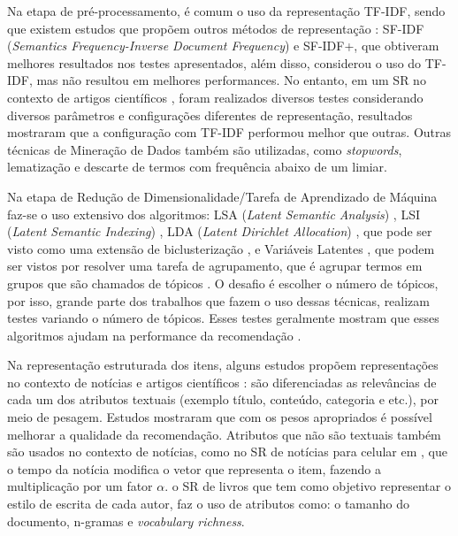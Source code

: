 \documentclass[normaltoc, espacoumemeio, pnumromarab,ruledheader]{abnt}
\begin{document}
Na etapa de pré-processamento, é comum o uso da representação TF-IDF, sendo que existem estudos que propõem outros métodos de representação \cite{Capelle2012, Moerland2013}: SF-IDF (\textit{Semantics Frequency-Inverse Document Frequency}) e SF-IDF+, que obtiveram melhores resultados nos testes apresentados, além disso,  considerou o uso do TF-IDF, mas não resultou em melhores performances.
No entanto, em um SR no contexto de artigos científicos \cite{Beel2013}, foram realizados diversos testes considerando diversos parâmetros e configurações diferentes de representação, resultados mostraram que a configuração com TF-IDF performou melhor que outras.
Outras técnicas de Mineração de Dados também são utilizadas, como \textit{stopwords}, lematização e descarte de termos com frequência abaixo de um limiar.

Na etapa de Redução de Dimensionalidade/Tarefa de Aprendizado de Máquina faz-se o uso extensivo dos algoritmos: LSA (\textit{Latent Semantic Analysis}) \cite{Taraghi2013, Domingues2012, Spaeth2013}, LSI (\textit{Latent Semantic Indexing}) \cite{Saaya2013}, LDA (\textit{Latent Dirichlet Allocation}) \cite{Tantanasiriwong2012, Qu2012, Wang2012, Vaz2012}, que pode ser visto como uma extensão de biclusterização \cite{Skillicorn2012}, e Variáveis Latentes \cite{Cleger2012}, que podem ser vistos por resolver uma tarefa de agrupamento, que é agrupar termos em grupos que são chamados de tópicos \cite{Wang2012}.
O desafio é escolher o número de tópicos, por isso, grande parte dos trabalhos que fazem o uso dessas técnicas, realizam testes variando o número de tópicos.
Esses testes geralmente mostram que esses algoritmos ajudam na performance da recomendação \cite{Cleger2012, Tantanasiriwong2012, Saaya2013, Spaeth2013,Vaz2012}.

Na representação estruturada dos itens, alguns estudos propõem representações no contexto de notícias e artigos científicos \cite{Bielikova2012, Lops2013}: são diferenciadas as relevâncias de cada um dos atributos textuais (exemplo título, conteúdo, categoria e etc.), por meio de pesagem.
Estudos mostraram que com os pesos apropriados é possível melhorar a qualidade da recomendação.
Atributos que não são textuais também são usados no contexto de notícias, como no SR de notícias para celular em \cite{Yeung2012}, que o tempo da notícia modifica o vetor que representa o item, fazendo a multiplicação por um fator $\alpha$. o SR de livros \cite{Vaz2012} que tem como objetivo representar o estilo de escrita de cada autor, faz o uso de atributos como: o tamanho do documento, n-gramas e \textit{vocabulary richness}.
\end{document}
